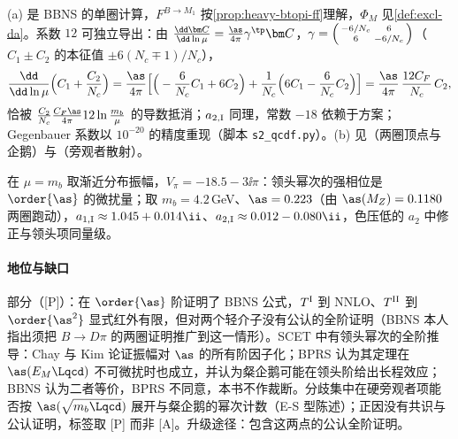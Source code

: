 \begin{proofsketch}
(a) 是 BBNS 的单圈计算\cite[式~(46)--(48)]{BenekeEtAl2001}，$F^{B\to M_1}$ 按\cref{prop:heavy-btopi-ff}理解，$\Phi_M$ 见\cref{def:excl-da}。系数 $12$ 可独立导出：由 $\frac{\dd\bm C}{\dd\ln\mu}=\frac{\as}{4\pi}\gamma^{\tp}\bm C$，$\gamma=\begin{psmallmatrix}-6/N_c&6\\6&-6/N_c\end{psmallmatrix}$（$C_1\pm C_2$ 的本征值 $\pm6(N_c\mp1)/N_c$），
\begin{equation}\label{eq:heavy-a1-rg}
\frac{\dd}{\dd\ln\mu}\Big(C_1+\frac{C_2}{N_c}\Big)=\frac{\as}{4\pi}\Big[\Big(-\frac{6}{N_c}C_1+6C_2\Big)+\frac1{N_c}\Big(6C_1-\frac6{N_c}C_2\Big)\Big]=\frac{\as}{4\pi}\,\frac{12C_F}{N_c}\,C_2 ,
\end{equation}
恰被 $\frac{C_2}{N_c}\frac{C_F\as}{4\pi}12\ln\frac{m_b}{\mu}$ 的导数抵消；$a_{2,\rm I}$ 同理，常数 $-18$ 依赖于方案；Gegenbauer 系数以 $10^{-20}$ 的精度重现（脚本 \texttt{s2\_\allowbreak qcdf.py}）。(b) 见\cite{Bell:2007tv,Bell:2009nk,Beneke:2009ek,Bell:2015koa,Bell:2020qus}（两圈顶点与企鹅）与\cite{Beneke:2005vv,Beneke:2006mk,Kivel:2006xc,Pilipp:2007mg,Beneke:2005gs}（旁观者散射）。
\end{proofsketch}

在 $\mu=m_b$ 取渐近分布振幅，$V_\pi=-18.5-3\ii\pi$：领头幂次的强相位是 $\order{\as}$ 的微扰量；取 $m_b=4.2$\,GeV、$\as=0.223$（由 $\as(M_Z)=0.1180$\cite[式~(9.25)]{ParticleDataGroup:2024cfk}两圈跑动），$a_{1,\rm I}\approx1.045+0.014\ii$、$a_{2,\rm I}\approx0.012-0.080\ii$，色压低的 $a_2$ 中修正与领头项同量级。

\paragraph{地位与缺口}
部分（[P]）：在 $\order{\as}$ 阶证明了 BBNS 公式，$T^{\rm I}$ 到 NNLO、$T^{\rm II}$ 到 $\order{\as^2}$ 显式红外有限，但对两个轻介子没有公认的全阶证明（BBNS 本人指出须把 $B\to D\pi$ 的两圈证明推广到这一情形\cite[第~8~节]{BenekeEtAl2000}）。SCET 中有领头幂次的全阶推导：Chay 与 Kim 论证振幅对 $\as$ 的所有阶因子化\cite{Chay:2003ju}；BPRS 认为其定理在 $\as(E_M\Lqcd)$ 不可微扰时也成立，并认为粲企鹅可能在领头阶给出长程效应\cite{Bauer:2004tj}；BBNS 认为二者等价\cite{Beneke:2004bn}，BPRS 不同意\cite{Bauer:2005wb}，本书不作裁断。分歧集中在硬旁观者项能否按 $\as(\sqrt{m_b\Lqcd})$ 展开与粲企鹅的幂次计数（E-S 型陈述）；正因没有共识与公认证明，标签取 [P] 而非 [A]。升级途径：包含这两点的公认全阶证明。

